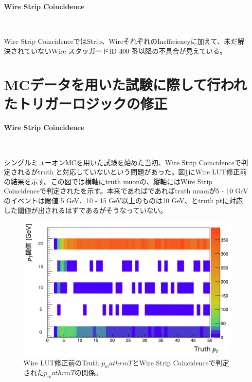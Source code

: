 \paragraph{Wire Strip Coincidence}　　
\par
Wire Strip CoincidenceではStrip、WireそれぞれのInefficiencyに加えて、未だ解決されていないWire スタッガードID 400 番以降の不具合が見えている。

\section{MCデータを用いた試験に際して行われたトリガーロジックの修正}
\label{sec:appendix:MC-test}
\paragraph{Wire Strip Coincidence}　　
\par
シングルミューオンMCを用いた試験を始めた当初、Wire Strip Coincidenceで判定される\pt がtruth \pt と対応していないという問題があった。図\ref{pt_before}にWire LUT修正前の結果を示す。この図では横軸にtruth muonの\pt、縦軸にはWire Strip Coincidenceで判定された\pt を示す。本来であればであればtruth muonが5 - 10 GeVのイベントは\pt 閾値 5 GeV、10 - 15 GeV以上のものは10 GeV、とtruth ptに対応した\pt 閾値が出されるはずであるがそうなっていない。

\begin{figure} 
\centering
\includegraphics[width=16cm]{fig/Test/pt_before.png}
\caption[]{Wire LUT修正前のTruth $p_mathrm{T}$とWire Strip Coincidenceで判定された$p_mathrm{T}$の関係。}
\label{pt_before}
\end{figure}


